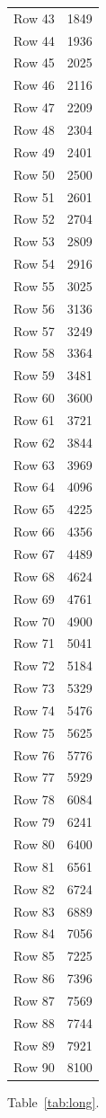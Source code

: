 \documentclass{article}
\begin{document}
\begin{longtable}{lr}
Row 43&1849\\
Row 44&1936\\
Row 45&2025\\
Row 46&2116\\
Row 47&2209\\
Row 48&2304\\
Row 49&2401\\
Row 50&2500\\
Row 51&2601\\
Row 52&2704\\
Row 53&2809\\
Row 54&2916\\
Row 55&3025\\
Row 56&3136\\
Row 57&3249\\
Row 58&3364\\
Row 59&3481\\
Row 60&3600\\
Row 61&3721\\
Row 62&3844\\
Row 63&3969\\
Row 64&4096\\
Row 65&4225\\
Row 66&4356\\
Row 67&4489\\
Row 68&4624\\
Row 69&4761\\
Row 70&4900\\
Row 71&5041\\
Row 72&5184\\
Row 73&5329\\
Row 74&5476\\
Row 75&5625\\
Row 76&5776\\
Row 77&5929\\
Row 78&6084\\
Row 79&6241\\
Row 80&6400\\
Row 81&6561\\
Row 82&6724\\
Row 83&6889\\
Row 84&7056\\
Row 85&7225\\
Row 86&7396\\
Row 87&7569\\
Row 88&7744\\
Row 89&7921\\
Row 90&8100\\
\end{longtable}Table~\ref{tab:long}.
\end{document}
